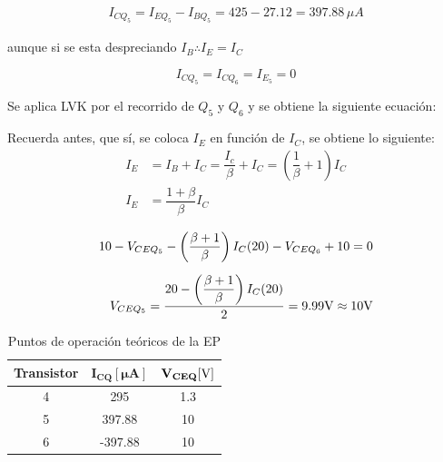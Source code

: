 \begin{enumerate}
        \begin{gather}
          I_{CQ_5}=I_{EQ_5}-I_{BQ_5}=425-27.12=397.88\, \mu A \label{icq5}
        \end{gather}


        aunque si se esta despreciando $I_B \therefore I_E=I_C$

        $$I_{CQ_5}=I_{CQ_6}=I_{E_5}=0$$

        Se aplica LVK por el recorrido de $Q_5$ y $Q_6$ y se obtiene la siguiente ecuación:

        Recuerda antes, que sí, se coloca $I_E$ en función de $I_C$, se obtiene lo siguiente:
        \begin{align*}
          I_E & =I_B+I_C=\dfrac{I_c}{\beta}+I_C=(\dfrac{1}{\beta}+1)I_C \\[0.2cm]
          I_E & =\dfrac{1+\beta}{\beta}I_C
        \end{align*}

        \begin{align*}
          10-V_{CEQ_5}-\left(\dfrac{\beta + 1}{\beta}\right )I_C(20)-V_{CEQ_6}+10=0 \\[0.2cm]
          V_{CEQ_5}=\dfrac{20-\left(\dfrac{\beta + 1}{\beta}\right)I_C(20)}{2}=9.99\volt \approx 10\volt
        \end{align*}

        \begin{table}[H] %
          \centering
          \begin{tabular}{|c |c |c|} %
            \hline %
            \textbf{Transistor} & $\mathbf{I_{CQ}[\mu A]}$ & $\mathbf{V_{CEQ}[\volt]}$ \\
            \hline
            4                   & 295                      & 1.3                       \\
            \hline
            5                   & 397.88                   & 10                        \\
            \hline
            6                   & -397.88                  & 10                        \\
            \hline
          \end{tabular}
          \caption{Puntos de operación teóricos de la EP}
          \label{tab:ptos_ep}
        \end{table}


\end{enumerate}
